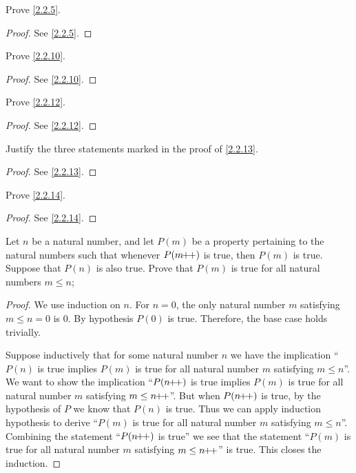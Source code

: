 \begin{ex}\label{ex:2.2.1}
  Prove \cref{2.2.5}.
\end{ex}

\begin{proof}
  See \cref{2.2.5}.
\end{proof}

\begin{ex}\label{ex:2.2.2}
  Prove \cref{2.2.10}.
\end{ex}

\begin{proof}
  See \cref{2.2.10}.
\end{proof}

\begin{ex}\label{ex:2.2.3}
  Prove \cref{2.2.12}.
\end{ex}

\begin{proof}
  See \cref{2.2.12}.
\end{proof}

\begin{ex}\label{ex:2.2.4}
  Justify the three statements marked in the proof of \cref{2.2.13}.
\end{ex}

\begin{proof}
  See \cref{2.2.13}.
\end{proof}

\begin{ex}\label{ex:2.2.5}
  Prove \cref{2.2.14}.
\end{ex}

\begin{proof}
  See \cref{2.2.14}.
\end{proof}

\begin{ex}\label{ex:2.2.6}
  Let \(n\) be a natural number, and let \(P(m)\) be a property pertaining to the natural numbers such that whenever \(P(m\!\!+\!\!+)\) is true, then \(P(m)\) is true.
  Suppose that \(P(n)\) is also true.
  Prove that \(P(m)\) is true for all natural numbers \(m \leq n\);
\end{ex}

\begin{proof}
  We use induction on \(n\).
  For \(n = 0\), the only natural number \(m\) satisfying \(m \leq n = 0\) is \(0\).
  By hypothesis \(P(0)\) is true.
  Therefore, the base case holds trivially.

  Suppose inductively that for some natural number \(n\) we have the implication ``\(P(n)\) is true implies \(P(m)\) is true for all natural number \(m\) satisfying \(m \leq n\)''.
  We want to show the implication ``\(P(n\!\!+\!\!+)\) is true implies \(P(m)\) is true for all natural number \(m\) satisfying \(m \leq n\!\!+\!\!+\)''.
  But when \(P(n\!\!+\!\!+)\) is true, by the hypothesis of \(P\) we know that \(P(n)\) is true.
  Thus we can apply induction hypothesis to derive ``\(P(m)\) is true for all natural number \(m\) satisfying \(m \leq n\)''.
  Combining the statement ``\(P(n\!\!+\!\!+)\) is true'' we see that the statement ``\(P(m)\) is true for all natural number \(m\) satisfying \(m \leq n\!\!+\!\!+\)'' is true.
  This closes the induction.
\end{proof}